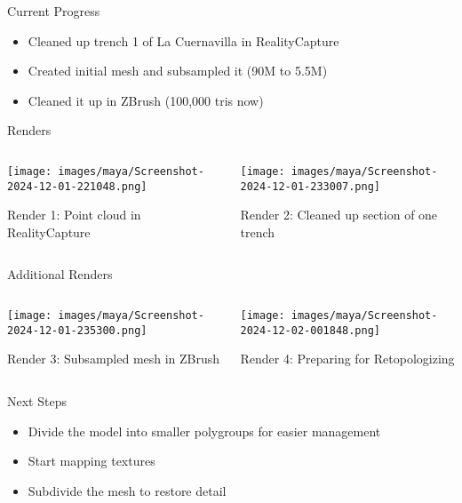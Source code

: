 \begin{frame}{Current Progress}
    \begin{itemize}
        \item Cleaned up trench 1 of La Cuernavilla in RealityCapture
        \item Created initial mesh and subsampled it (90M to 5.5M)
        \item Cleaned it up in ZBrush (100,000 tris now)
    \end{itemize}    
\end{frame}

\begin{frame}{Renders}
    \begin{columns}[T] %
        \begin{column}{0.5\textwidth}
            \texttt{[image: images/maya/Screenshot-2024-12-01-221048.png]}
            \caption{Render 1: Point cloud in RealityCapture}
        \end{column}
        \begin{column}{0.5\textwidth}
            \texttt{[image: images/maya/Screenshot-2024-12-01-233007.png]}
            \caption{Render 2: Cleaned up section of one trench}
        \end{column}
    \end{columns}
\end{frame}

\begin{frame}{Additional Renders}
    \begin{columns}[T] %
        \begin{column}{0.5\textwidth}
            \texttt{[image: images/maya/Screenshot-2024-12-01-235300.png]}
            \caption{Render 3: Subsampled mesh in ZBrush}
        \end{column}
        \begin{column}{0.5\textwidth}
            \texttt{[image: images/maya/Screenshot-2024-12-02-001848.png]}
            \caption{Render 4: Preparing for Retopologizing}
        \end{column}
    \end{columns}
\end{frame}

\begin{frame}{Next Steps}
    \begin{itemize}
        \item Divide the model into smaller polygroups for easier management
        \item Start mapping textures
        \item Subdivide the mesh to restore detail
    \end{itemize}    
\end{frame}
